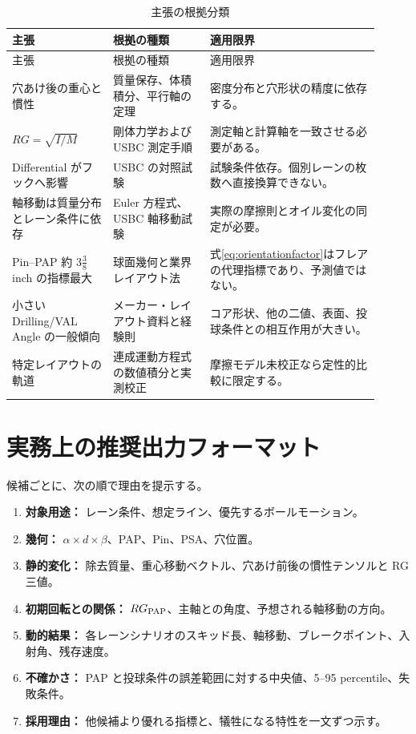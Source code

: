\documentclass[11pt,a4paper]{article}
\begin{document}
\begin{longtable}{p{0.25\linewidth}p{0.24\linewidth}p{0.42\linewidth}}
\caption{主張の根拠分類}\label{tab:evidence}\\
\toprule
主張 & 根拠の種類 & 適用限界\\
\midrule
\endfirsthead
\toprule
主張 & 根拠の種類 & 適用限界\\
\midrule
\endhead
穴あけ後の重心と慣性 & 質量保存、体積積分、平行軸の定理 & 密度分布と穴形状の精度に依存する。\\
$RG=\sqrt{I/M}$ & 剛体力学および USBC 測定手順 & 測定軸と計算軸を一致させる必要がある。\\
Differential がフックへ影響 & USBC の対照試験 & 試験条件依存。個別レーンの枚数へ直接換算できない。\\
軸移動は質量分布とレーン条件に依存 & Euler 方程式、USBC 軸移動試験 & 実際の摩擦則とオイル変化の同定が必要。\\
Pin--PAP 約 $3\frac{3}{8}$ inch の指標最大 & 球面幾何と業界レイアウト法 & 式\eqref{eq:orientationfactor}はフレアの代理指標であり、予測値ではない。\\
小さい Drilling/VAL Angle の一般傾向 & メーカー・レイアウト資料と経験則 & コア形状、他の二値、表面、投球条件との相互作用が大きい。\\
特定レイアウトの軌道 & 連成運動方程式の数値積分と実測校正 & 摩擦モデル未校正なら定性的比較に限定する。\\
\bottomrule
\end{longtable}

\section{実務上の推奨出力フォーマット}

候補ごとに、次の順で理由を提示する。

\begin{enumerate}
  \item \textbf{対象用途：} レーン条件、想定ライン、優先するボールモーション。
  \item \textbf{幾何：} $\alpha\times d\times\beta$、PAP、Pin、PSA、穴位置。
  \item \textbf{静的変化：} 除去質量、重心移動ベクトル、穴あけ前後の慣性テンソルと RG 三値。
  \item \textbf{初期回転との関係：} $RG_{\rm PAP}$、主軸との角度、予想される軸移動の方向。
  \item \textbf{動的結果：} 各レーンシナリオのスキッド長、軸移動、ブレークポイント、入射角、残存速度。
  \item \textbf{不確かさ：} PAP と投球条件の誤差範囲に対する中央値、5--95 percentile、失敗条件。
  \item \textbf{採用理由：} 他候補より優れる指標と、犠牲になる特性を一文ずつ示す。
\end{enumerate}
\end{document}
